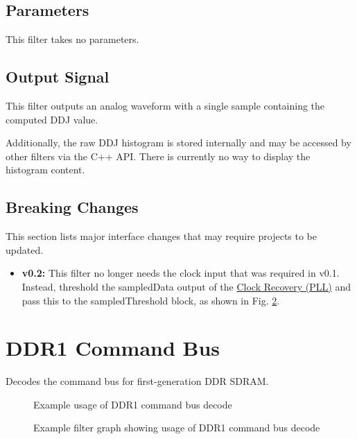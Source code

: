 \subsection{Parameters}

This filter takes no parameters.

\subsection{Output Signal}

This filter outputs an analog waveform with a single sample containing the computed DDJ value.

Additionally, the raw DDJ histogram is stored internally and may be accessed by other filters via the C++ API. There is
currently no way to display the histogram content.

\subsection{Breaking Changes}

This section lists major interface changes that may require projects to be updated.

\begin{itemize}
\item \textbf{v0.2:} This filter no longer needs the clock input that was required in v0.1.
Instead, threshold the sampledData output of the \hyperref[filter:cdrpll]{Clock Recovery (PLL)} and pass this to the
sampledThreshold block, as shown in Fig. \ref{filter_graph_ddj}.
\end{itemize}

\pagebreak
\section{DDR1 Command Bus}

Decodes the command bus for first-generation DDR SDRAM.

\begin{figure}[h]
\centering
{}
\caption{Example usage of DDR1 command bus decode}
\label{filter_ddr1}
\end{figure}

\begin{figure}[h]
\centering
{}
\caption{Example filter graph showing usage of DDR1 command bus decode}
\label{filter_graph_ddj}
\end{figure}

